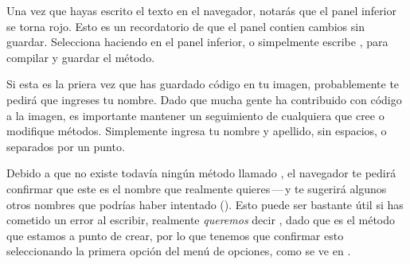 \documentclass[a4paper,10pt,twoside]{book}
\begin{document}
Una vez que hayas escrito el texto en el navegador, notar\'as que el panel inferior se torna rojo. Esto es un recordatorio de que el panel contien cambios sin guardar.
Selecciona  haciendo  en el panel inferior, o simpelmente escribe , para compilar y guardar el m\'etodo.

Si esta es la priera vez que has guardado c\'odigo en tu imagen, probablemente te pedir\'a que ingreses tu nombre. Dado que mucha gente ha contribuido con c\'odigo a la imagen, es importante mantener un seguimiento de cualquiera que cree o modifique m\'etodos. Simplemente ingresa tu nombre y apellido, sin espacios, o separados por un punto.


Debido a que no existe todav\'ia ning\'un m\'etodo llamado , el navegador te pedir\'a confirmar que este es el nombre que realmente quieres\,---\,y te sugerir\'a algunos otros nombres que podr\'ias haber intentado ().
Esto puede ser bastante \'util si has cometido un error al escribir, realmente \emph{queremos} decir , dado que es el m\'etodo que estamos a punto de crear, por lo que tenemos que confirmar esto seleccionando la primera opci\'on del men\'u de opciones, como se ve en . 


\end{document}
